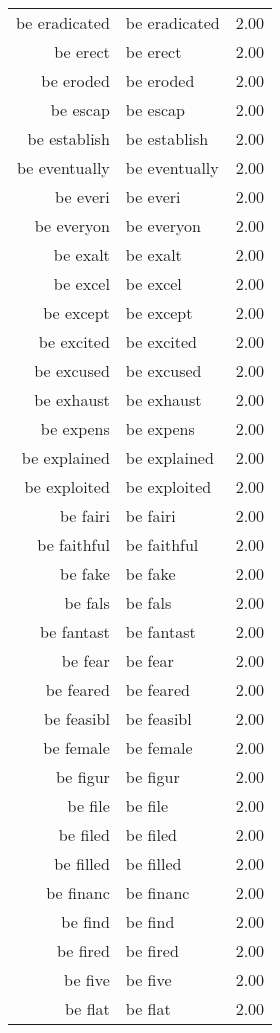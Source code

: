 \begin{table}[ht]
\begin{tabular}{rlr}
  be eradicated & be eradicated & 2.00 \\ 
  be erect & be erect & 2.00 \\ 
  be eroded & be eroded & 2.00 \\ 
  be escap & be escap & 2.00 \\ 
  be establish & be establish & 2.00 \\ 
  be eventually & be eventually & 2.00 \\ 
  be everi & be everi & 2.00 \\ 
  be everyon & be everyon & 2.00 \\ 
  be exalt & be exalt & 2.00 \\ 
  be excel & be excel & 2.00 \\ 
  be except & be except & 2.00 \\ 
  be excited & be excited & 2.00 \\ 
  be excused & be excused & 2.00 \\ 
  be exhaust & be exhaust & 2.00 \\ 
  be expens & be expens & 2.00 \\ 
  be explained & be explained & 2.00 \\ 
  be exploited & be exploited & 2.00 \\ 
  be fairi & be fairi & 2.00 \\ 
  be faithful & be faithful & 2.00 \\ 
  be fake & be fake & 2.00 \\ 
  be fals & be fals & 2.00 \\ 
  be fantast & be fantast & 2.00 \\ 
  be fear & be fear & 2.00 \\ 
  be feared & be feared & 2.00 \\ 
  be feasibl & be feasibl & 2.00 \\ 
  be female & be female & 2.00 \\ 
  be figur & be figur & 2.00 \\ 
  be file & be file & 2.00 \\ 
  be filed & be filed & 2.00 \\ 
  be filled & be filled & 2.00 \\ 
  be financ & be financ & 2.00 \\ 
  be find & be find & 2.00 \\ 
  be fired & be fired & 2.00 \\ 
  be five & be five & 2.00 \\ 
  be flat & be flat & 2.00 \\ 

\end{tabular}
\end{table}
